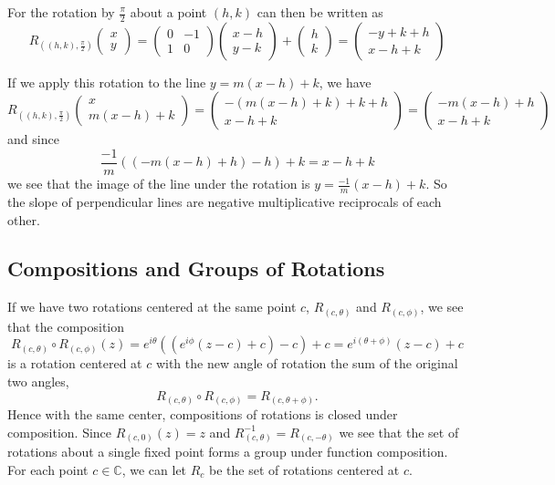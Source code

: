 \documentclass[
]{book}
\theoremstyle{definition}
\theoremstyle{definition}
\theoremstyle{definition}
\theoremstyle{definition}
\theoremstyle{remark}
\begin{document}
For the rotation by \(\frac{\pi}{2}\) about a point \((h,k)\) can then be written as
\[R_{((h,k),\frac{\pi}{2})}\begin{pmatrix} x \\ y \end{pmatrix} = \begin{pmatrix} 0 & -1 \\ 1 & 0 \end{pmatrix} \begin{pmatrix} x-h \\ y-k \end{pmatrix} + \begin{pmatrix} h \\ k \end{pmatrix} = \begin{pmatrix} -y+k+h \\ x-h+k  \end{pmatrix}\]

If we apply this rotation to the line \(y=m(x-h)+k\), we have
\[R_{((h,k),\frac{\pi}{2})} \begin{pmatrix} x \\ m(x-h)+k \end{pmatrix} = \begin{pmatrix} -(m(x-h)+k)+k+h \\ x-h+k   \end{pmatrix}= \begin{pmatrix} -m(x-h)+h \\ x-h+k \end{pmatrix}\] and since \[\frac{-1}{m} \left( (-m(x-h)+h)-h\right)+k = x-h+k\] we see that the image of the line under the rotation is \(y=\frac{-1}{m} (x-h)+k\). So the slope of perpendicular lines are negative multiplicative reciprocals of each other.

\hypertarget{compositions-and-groups-of-rotations}{%
\subsection{Compositions and Groups of Rotations}\label{compositions-and-groups-of-rotations}}

If we have two rotations centered at the same point \(c\), \(R_{(c,\theta)}\) and \(R_{(c,\phi)}\), we see that the composition
\[R_{(c,\theta)} \circ R_{(c,\phi)} (z) = e^{i\theta} \left( \left( e^{i \phi} (z-c) + c\right) -c\right) + c = e^{i(\theta+\phi)} (z-c)+c\] is a rotation centered at \(c\) with the new angle of rotation the sum of the original two angles, \[R_{(c,\theta)} \circ R_{(c,\phi)} = R_{(c, \theta+\phi)}.\] Hence with the same center, compositions of rotations is closed under composition. Since \(R_{(c,0)}(z)=z\) and \(R_{(c,\theta)}^{-1} = R_{(c,-\theta)}\) we see that the set of rotations about a single fixed point forms a group under function composition. For each point \(c\in \mathbb{C}\), we can let \(R_c\) be the set of rotations centered at \(c\).
\end{document}

